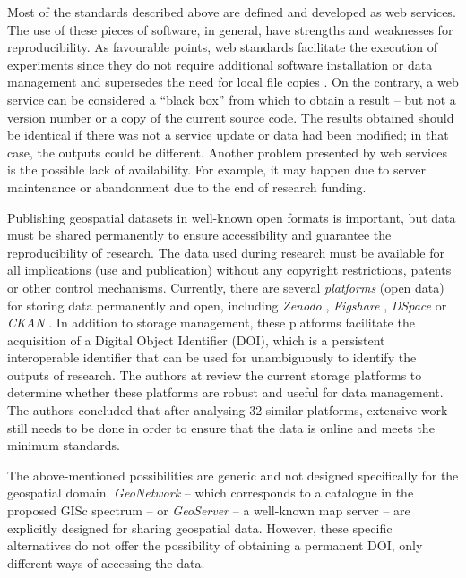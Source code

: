 \documentclass[ijgi,article,submit,moreauthors,pdftex]{Definitions/mdpi}
\begin{document}
Most of the standards described above are defined and developed as web services. The use of these pieces of software, in general, have strengths and weaknesses for reproducibility. As favourable points, web standards facilitate the execution of experiments since they do not require additional software installation or data management and supersedes the need for local file copies \cite{nust2011connecting}. On the contrary, a web service can be considered a ``black box'' from which to obtain a result -- but not a version number or a copy of the current source code. The results obtained should be identical if there was not a service update or data had been modified; in that case, the outputs could be different. Another problem presented by web services is the possible lack of availability. For example, it may happen due to server maintenance or abandonment due to the end of research funding.

Publishing geospatial datasets in well-known open formats is important, but data must be shared permanently to ensure accessibility and guarantee the reproducibility of research. The data used during research must be available for all implications (use and publication) without any copyright restrictions, patents or other control mechanisms. Currently, there are several \textit{platforms} (open data) for storing data permanently and open, including \textit{Zenodo} \cite{zenodo}, \textit{Figshare} \cite{figshare}, \textit{DSpace} \cite{dspace} or \textit{CKAN} \cite{ckan}. In addition to storage management, these platforms facilitate the acquisition of a Digital Object Identifier (DOI), which is a persistent interoperable identifier that can be used for unambiguously to identify the outputs of research. The authors at \cite{austin2016research} review the current storage platforms to determine whether these platforms are robust and useful for data management. The authors concluded that after analysing 32 similar platforms, extensive work still needs to be done in order to ensure that the data is online and meets the minimum standards.

The above-mentioned possibilities are generic and not designed specifically for the geospatial domain. \textit{GeoNetwork} \cite{geonetwork} -- which corresponds to a catalogue in the proposed GISc spectrum -- or \textit{GeoServer} \cite{geoserver} -- a well-known map server -- are explicitly designed for sharing geospatial data. However, these specific alternatives do not offer the possibility of obtaining a permanent DOI, only different ways of accessing the data.
\end{document}
